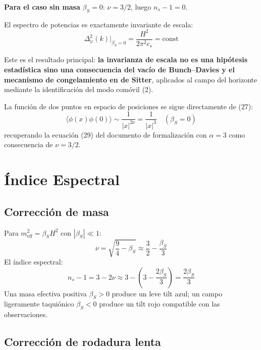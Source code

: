 \documentclass[12pt,a4paper]{article}
\begin{document}
\textbf{Para el caso sin masa} $\beta_S = 0$: $\nu = 3/2$, luego $n_s - 1 = 0$.

El espectro de potencias es exactamente invariante de escala:
\begin{equation}
\Delta_\psi^2(k)\big|_{\beta_S=0} = \frac{H^2}{2\pi^2 c_s} = \text{const} \tag{27}
\end{equation}

Este es el resultado principal: \textbf{la invarianza de escala no es una hipótesis estadística sino una consecuencia del vacío de Bunch--Davies y el mecanismo de congelamiento en de Sitter}, aplicados al campo del horizonte mediante la identificación del modo comóvil (2).

La función de dos puntos en espacio de posiciones se sigue directamente de (27):
\begin{equation}
\langle\phi(x)\phi(0)\rangle \sim \frac{1}{|x|^{2\nu}} = \frac{1}{|x|^3} \quad (\beta_S = 0) \tag{28}
\end{equation}
recuperando la ecuación (29) del documento de formalización con $\alpha = 3$ como consecuencia de $\nu = 3/2$.

\section{Índice Espectral}

\subsection{Corrección de masa}

Para $m_\text{eff}^2 = \beta_S H^2$ con $|\beta_S| \ll 1$:
\begin{equation}
\nu = \sqrt{\frac{9}{4} - \beta_S} \approx \frac{3}{2} - \frac{\beta_S}{3} \tag{29}
\end{equation}
El índice espectral:
\begin{equation}
n_s - 1 = 3 - 2\nu \approx 3 - \left(3 - \frac{2\beta_S}{3}\right) = \frac{2\beta_S}{3} \tag{30}
\end{equation}
Una masa efectiva positiva $\beta_S > 0$ produce un leve tilt azul; un campo ligeramente taquiónico $\beta_S < 0$ produce un tilt rojo compatible con las observaciones.

\subsection{Corrección de rodadura lenta}
\end{document}
